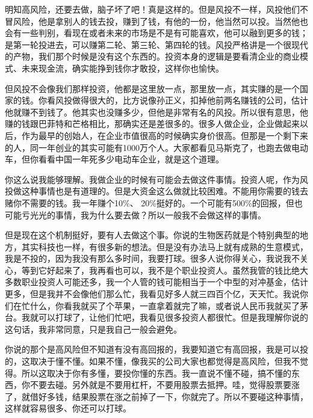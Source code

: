 
明知高风险，还要去做，脑子坏了吧！真是这样的。但是风投不一样，风投他们不冒风险，他是拿别人的钱去投，赚到了钱，有他的一份，他当然可以投。当然他也会有一些判别，看现在或者未来的市场是不是有可能喜欢，他可以融到更多的钱；是第一轮投进去，可以赚第二轮、第三轮、第四轮的钱。风投严格讲是一个很现代的产物，我们那个时候是没有这个东西的。投资本身的逻辑是要看清企业的商业模式、未来现金流，确实能挣到钱你才敢投，这样你也愉快。

但风投不会像我们那样投资，他都是这里放一点，那里放一点，其实赚的是一个国家的钱。你看风投做得很大的，比方说像孙正义，扣掉他前两名赚钱的公司，估计他就赚不到钱了。他其实也没赚多少，但他是非常有名的风投。所以很有意思，他赚的钱跟巴菲特和芒格相比，那确实还是差很多的。很多人做企业，企业做起来以后，作为最早的创始人，在企业市值很高的时候确实身价很高。但那是一个剩下来的人，同一年创业的其实可能有1000万个人。大家都看见马斯克了，也跑去做电动车，但你看看中国一年死多少电动车企业，就是这个道理。


你这么说我能够理解。我做企业的时候有可能会去做这件事情。投资人呢，作为风投做这种事情也是有道理的。但是大资金这么做就比较困难。不能用你需要的钱去赌你不需要的钱。我一年赚个10\%、 20\%挺好的。一个可能有500\%的回报，但也可能亏光光的事情，我为什么要去做？所以一般我不会做这样的事情。

但是现在这个机制挺好，要有人去做这个事。你说的生物医药就是个特别典型的地方，其实科技也一样，有很多新的想法。但是没有办法马上就有成熟的生意模式，我是不投的，因为我没有那么多时间，我要打球。很多人说你得关心，我说我不关心，等到它好起来了，我再看也可以，我不是个职业投资人。虽然我管的钱比绝大多数职业投资人可能还多，我一个人管的钱可能相当于一个中型的对冲基金，估计更多，但是我并不会像他们那么忙，我看见好多人就三四百个亿，天天忙。我说你们在忙什么，你看我就买了个苹果，一直拿着就完了嘛，或者说人民币我就买了茅台。我就可以打球了，让他们忙吧，我看见很多投资人都很忙。但是我理解你说的这句话，我非常同意，只是我自己一般会避免。


你说的那个是高风险但不知道有没有高回报的，我要知道它有高回报，我是可以投的，这取决于懂不懂。如果不懂，像我买的公司大家也都觉得是高风险，但我不觉得。所以这取决于你有多懂，要投你懂的东西。我一直说不懂不碰，搞不懂的东西，你不要去碰。另外就是不要用杠杆，不要用股票去抵押。哇，觉得股票要涨了，就借好多钱，结果股票在涨之前掉了一下，你就完了。所以不要碰这种事情，这样就容易很多、你还可以打球。

